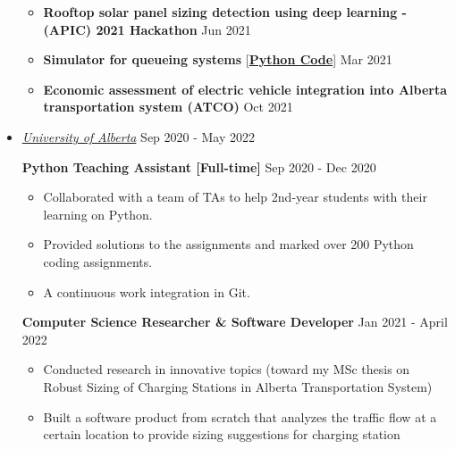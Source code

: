 \documentclass[10pt,a4paper,sans]{moderncv} %
\begin{document}
\begin{itemize}
\begin{itemize}
		\item \textbf{Rooftop solar panel sizing detection using deep learning -\textbf{ (APIC) 2021 Hackathon}} \hfill Jun 2021
		\item\textbf{Simulator for queueing systems} [\href{https://github.com/Hadi2525/queueing_theory}{\textbf{Python Code}}] \hfill Mar 2021
	 	\item \textbf{Economic assessment of electric vehicle integration into Alberta transportation system (ATCO)} \hfill Oct 2021
	\end{itemize}

\vspace{0.5cm}
	\item \href{http://ualberta.ca/}{ \emph{\large University of Alberta}} \hfill Sep 2020 - May 2022
	
	
	
	\textbf{Python Teaching Assistant [Full-time]} \hfill Sep 2020 - Dec 2020
	\begin{itemize}
		\item Collaborated with a team of TAs to help 2nd-year students with their learning on Python.
		\item Provided solutions to the assignments and marked over 200 Python coding assignments.
		\item A continuous work integration in Git.
	\end{itemize}

	\textbf{Computer Science Researcher \& Software Developer} \hfill Jan 2021 - April 2022
	\begin{itemize}
		\item Conducted research in innovative topics (toward my MSc thesis on Robust Sizing of Charging Stations in Alberta Transportation System)
		\item Built a software product from scratch that analyzes the traffic flow at a certain location to provide sizing suggestions for charging station
	\end{itemize}
\vspace{0.5cm}


\end{itemize}
\end{document}
